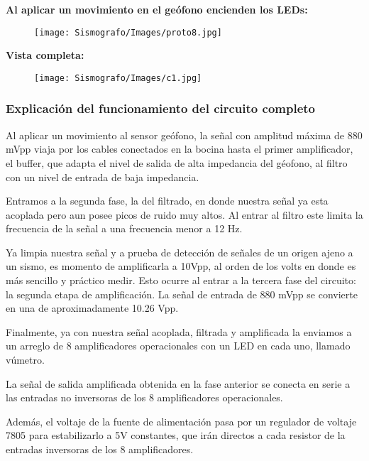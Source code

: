 \documentclass[12pt]{article}
\begin{document}
           \textbf{ Al aplicar un movimiento en el geófono encienden los LEDs:}
            \begin{figure}[h!]
                \centering
                \texttt{[image: Sismografo/Images/proto8.jpg]}
            \end{figure} 
            
            \textbf{Vista completa:}
            \begin{figure}[h!]
                \centering
                \texttt{[image: Sismografo/Images/c1.jpg]}
            \end{figure} 
            \subsubsection{Explicación del funcionamiento del circuito completo}
	        Al aplicar un movimiento al sensor geófono, la señal con amplitud máxima de 880 mVpp viaja por los cables conectados en la bocina hasta el primer amplificador, el buffer, que adapta el nivel de salida de alta impedancia del géofono, al filtro con un nivel de entrada de baja impedancia.
	        
	        Entramos a la segunda fase, la del filtrado, en donde nuestra señal ya esta acoplada pero aun posee picos de ruido muy altos. Al entrar al filtro este limita la frecuencia de la señal a una frecuencia menor a 12 Hz.
	        
	        Ya limpia nuestra señal y a prueba de detección de señales de un origen ajeno a un sismo, es momento de amplificarla a 10Vpp, al orden de los volts en donde es más sencillo y práctico medir. Esto ocurre al entrar a la tercera fase del circuito: la segunda etapa de amplificación. La señal de entrada de 880 mVpp se convierte en una de aproximadamente 10.26 Vpp.
	        
	        Finalmente, ya con nuestra señal acoplada, filtrada y amplificada la enviamos a un arreglo de 8 amplificadores operacionales con un LED en cada uno, llamado vúmetro. 
	        
	        La señal de salida amplificada obtenida en la fase anterior se conecta en serie a las entradas no inversoras de los 8 amplificadores operacionales. 
	        
	        Además, el voltaje de la fuente de alimentación pasa por un regulador de voltaje 7805 para estabilizarlo a 5V constantes, que irán directos a cada resistor de la entradas inversoras de los 8 amplificadores.
	        
\end{document}
